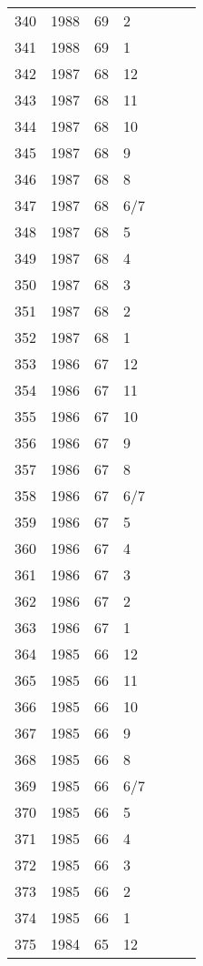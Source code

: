 \begin{longtable}{ |l|l|l|l|l|l|l| }
340 & 1988 & 69 & 2 &  &  &  \\
341 & 1988 & 69 & 1 &  &  &  \\
342 & 1987 & 68 & 12 &  &  &  \\
343 & 1987 & 68 & 11 &  &  &  \\
344 & 1987 & 68 & 10 &  &  &  \\
345 & 1987 & 68 & 9 &  &  &  \\
346 & 1987 & 68 & 8 &  &  &  \\
347 & 1987 & 68 & 6/7 &  &  &  \\
348 & 1987 & 68 & 5 &  &  &  \\
349 & 1987 & 68 & 4 &  &  &  \\
350 & 1987 & 68 & 3 &  &  &  \\
351 & 1987 & 68 & 2 &  &  &  \\
352 & 1987 & 68 & 1 &  &  &  \\
353 & 1986 & 67 & 12 &  &  &  \\
354 & 1986 & 67 & 11 &  &  &  \\
355 & 1986 & 67 & 10 &  &  &  \\
356 & 1986 & 67 & 9 &  &  &  \\
357 & 1986 & 67 & 8 &  &  &  \\
358 & 1986 & 67 & 6/7 &  &  &  \\
359 & 1986 & 67 & 5 &  &  &  \\
360 & 1986 & 67 & 4 &  &  &  \\
361 & 1986 & 67 & 3 &  &  &  \\
362 & 1986 & 67 & 2 &  &  &  \\
363 & 1986 & 67 & 1 &  &  &  \\
364 & 1985 & 66 & 12 &  &  &  \\
365 & 1985 & 66 & 11 &  &  &  \\
366 & 1985 & 66 & 10 &  &  &  \\
367 & 1985 & 66 & 9 &  &  &  \\
368 & 1985 & 66 & 8 &  &  &  \\
369 & 1985 & 66 & 6/7 &  &  &  \\
370 & 1985 & 66 & 5 &  &  &  \\
371 & 1985 & 66 & 4 &  &  &  \\
372 & 1985 & 66 & 3 &  &  &  \\
373 & 1985 & 66 & 2 &  &  &  \\
374 & 1985 & 66 & 1 &  &  &  \\
375 & 1984 & 65 & 12 &  &  &  \\

\end{longtable}
